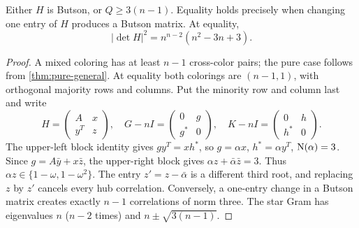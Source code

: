\begin{theorem}\label{thm:first-gap}
Either $H$ is Butson, or $Q\ge3(n-1)$. Equality holds precisely when changing one entry of $H$ produces a Butson matrix. At equality,
\[|\det H|^2=n^{n-2}(n^2-3n+3).\]
\end{theorem}
\begin{proof}
A mixed coloring has at least $n-1$ cross-color pairs; the pure case follows from \cref{thm:pure-general}. At equality both colorings are $(n-1,1)$, with orthogonal majority rows and columns. Put the minority row and column last and write
\[
 H=\begin{pmatrix}A&x\\y^T&z\end{pmatrix},\quad
 G-nI=\begin{pmatrix}0&g\\g^*&0\end{pmatrix},\quad
 K-nI=\begin{pmatrix}0&h\\h^*&0\end{pmatrix}.
\]
The upper-left block identity gives $gy^T=xh^*$, so $g=\alpha x$, $h^*=\alpha y^T$, $\operatorname N(\alpha)=3$. Since $g=A\bar y+x\bar z$, the upper-right block gives $\alpha z+\bar\alpha\bar z=3$. Thus $\alpha z\in\{1-\omega,1-\omega^2\}$. The entry $z'=z-\bar\alpha$ is a different third root, and replacing $z$ by $z'$ cancels every hub correlation. Conversely, a one-entry change in a Butson matrix creates exactly $n-1$ correlations of norm three. The star Gram has eigenvalues $n$ ($n-2$ times) and $n\pm\sqrt{3(n-1)}$.
\end{proof}

